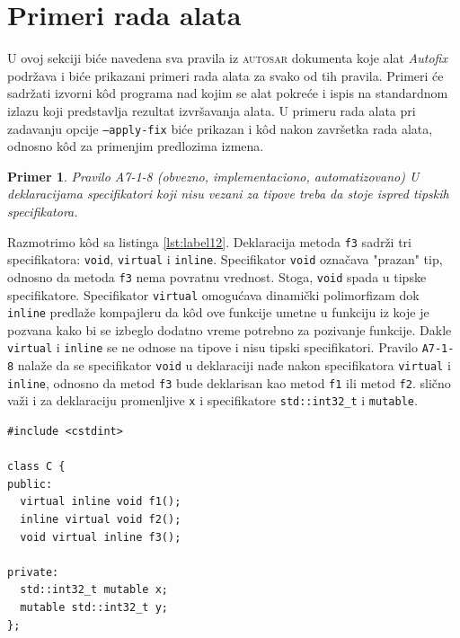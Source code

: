 \documentclass[12pt,oneside]{memoir}
\newtheorem{primer}{Primer}[section]
\begin{document}
\section{Primeri rada alata}

U ovoj sekciji bi\'{c}e navedena sva pravila iz \textsc{autosar} dokumenta koje alat \textit{Autofix} podr\v{z}ava i bi\'{c}e prikazani primeri rada alata za svako od tih pravila.
Primeri \'{c}e sadr\v{z}ati izvorni k\^{o}d programa nad kojim se alat pokre\'{c}e i ispis na standardnom izlazu koji predstavlja rezultat izvr\v{s}avanja alata. U primeru rada alata
pri zadavanju opcije \texttt{--apply-fix} bi\'{c}e prikazan i k\^{o}d nakon zavr\v{s}etka rada alata, odnosno k\^{o}d za primenjim predlozima izmena.\\

\begin{primer}
         Pravilo A7-1-8 (obvezno, implementaciono, automatizovano) \newline
         U deklaracijama specifikatori koji nisu vezani za tipove treba da stoje
         ispred tipskih specifikatora.
\end{primer}

Razmotrimo k\^{o}d sa listinga \ref{lst:label12}. Deklaracija metoda \texttt{f3} sadr\v{z}i tri specifikatora: \texttt{void}, \texttt{virtual} i \texttt{inline}.
Specifikator \texttt{void} ozna\v{c}ava "prazan" tip, odnosno da metoda \texttt{f3} nema povratnu vrednost. Stoga, \texttt{void} spada u tipske specifikatore.
Specifikator \texttt{virtual} omogu\'{c}ava dinami\v{c}ki polimorfizam dok \texttt{inline} predla\v{z}e kompajleru da k\^{o}d ove funkcije umetne u funkciju iz koje je pozvana
kako bi se izbeglo dodatno vreme potrebno za pozivanje funkcije. Dakle \texttt{virtual} i \texttt{inline} se ne odnose na tipove i nisu tipski specifikatori. Pravilo
\texttt{A7-1-8} nala\v{z}e da se specifikator \texttt{void} u deklaraciji nađe nakon specifikatora \texttt{virtual} i  \texttt{inline}, odnosno da metod \texttt{f3} bude
deklarisan kao metod \texttt{f1} ili metod \texttt{f2}. sli\v{c}no va\v{z}i i za deklaraciju promenljive \texttt{x} i specifikatore \texttt{std::int32\_t} i \texttt{mutable}. \\ 


\begin{lstlisting}[style=customc, caption={Primer koda koji nije napisan u skladu sa pravilom A7-1-8.}, label=lst:label12]
#include <cstdint>

class C {
public:
  virtual inline void f1();
  inline virtual void f2();
  void virtual inline f3();

private:
  std::int32_t mutable x;
  mutable std::int32_t y;
};
\end{lstlisting}
\end{document}
